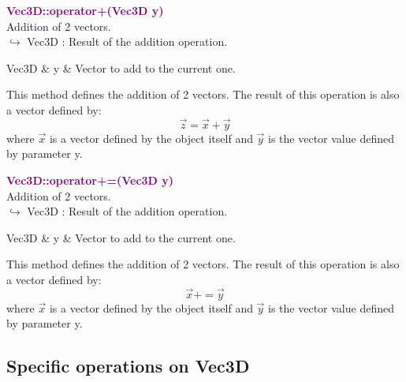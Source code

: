 \textcolor{purple}{\textbf{Vec3D::operator+(Vec3D y)}}\label{Vec3D::operator+(Vec3D y)}\\
Addition of 2 vectors.\\ \hspace*{10mm}$\hookrightarrow$ Vec3D : Result of the addition operation.

\begin{tcolorbox}[width=\textwidth,myArgs,tabularx={ll|R}]
Vec3D & y & Vector to add to the current one.
\end{tcolorbox}

This method defines the addition of 2 vectors.
The result of this operation is also a vector defined by:
\begin{equation*}
\overrightarrow{z} = \overrightarrow{x} + \overrightarrow{y}
\end{equation*}
where $\overrightarrow{x}$ is a vector defined by the object itself and $\overrightarrow{y}$ is the vector value defined by parameter y.

\textcolor{purple}{\textbf{Vec3D::operator+=(Vec3D y)}}\label{Vec3D::operator+=(Vec3D y)}\\
Addition of 2 vectors.\\ \hspace*{10mm}$\hookrightarrow$ Vec3D : Result of the addition operation.

\begin{tcolorbox}[width=\textwidth,myArgs,tabularx={ll|R}]
Vec3D & y & Vector to add to the current one.
\end{tcolorbox}

This method defines the addition of 2 vectors.
The result of this operation is also a vector defined by:
\begin{equation*}
\overrightarrow{x} += \overrightarrow{y}
\end{equation*}
where $\overrightarrow{x}$ is a vector defined by the object itself and $\overrightarrow{y}$ is the vector value defined by parameter y.

\subsection{Specific operations on Vec3D}

